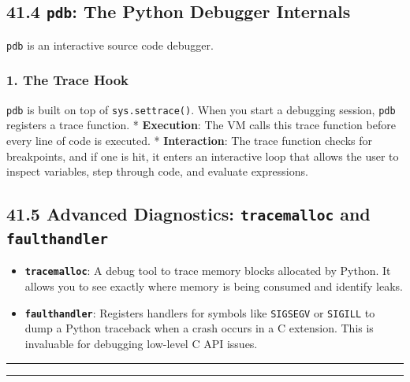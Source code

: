 \hypertarget{pdb-the-python-debugger-internals}{%
\subsection{\texorpdfstring{41.4 \texttt{pdb}: The Python Debugger
Internals}{41.4 pdb: The Python Debugger Internals}}\label{pdb-the-python-debugger-internals}}

\passthrough{\lstinline!pdb!} is an interactive source code debugger.

\hypertarget{the-trace-hook}{%
\subsubsection{1. The Trace Hook}\label{the-trace-hook}}

\passthrough{\lstinline!pdb!} is built on top of
\passthrough{\lstinline!sys.settrace()!}. When you start a debugging
session, \passthrough{\lstinline!pdb!} registers a trace function. *
\textbf{Execution}: The VM calls this trace function before every line
of code is executed. * \textbf{Interaction}: The trace function checks
for breakpoints, and if one is hit, it enters an interactive loop that
allows the user to inspect variables, step through code, and evaluate
expressions.

\hypertarget{advanced-diagnostics-tracemalloc-and-faulthandler}{%
\subsection{\texorpdfstring{41.5 Advanced Diagnostics:
\texttt{tracemalloc} and
\texttt{faulthandler}}{41.5 Advanced Diagnostics: tracemalloc and faulthandler}}\label{advanced-diagnostics-tracemalloc-and-faulthandler}}

\begin{itemize}
\tightlist
\item
  \textbf{\passthrough{\lstinline!tracemalloc!}}: A debug tool to trace
  memory blocks allocated by Python. It allows you to see exactly where
  memory is being consumed and identify leaks.
\item
  \textbf{\passthrough{\lstinline!faulthandler!}}: Registers handlers
  for symbols like \passthrough{\lstinline!SIGSEGV!} or
  \passthrough{\lstinline!SIGILL!} to dump a Python traceback when a
  crash occurs in a C extension. This is invaluable for debugging
  low-level C API issues.
\end{itemize}

\begin{center}\rule{0.5\linewidth}{0.5pt}\end{center}

\begin{center}\rule{0.5\linewidth}{0.5pt}\end{center}
